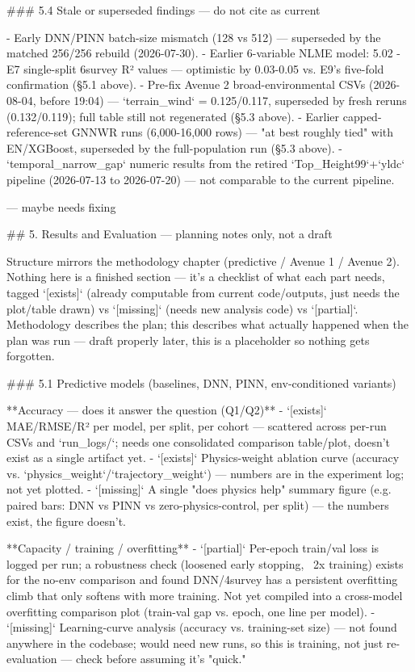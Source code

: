 ### 5.4 Stale or superseded findings — do not cite as current

- Early DNN/PINN batch-size mismatch (128 vs 512) — superseded by the matched 256/256 rebuild (2026-07-30).
- Earlier 6-variable NLME model: 5.02%
- E7 single-split 6survey R² values — optimistic by 0.03-0.05 vs. E9's five-fold confirmation (§5.1 above).
- Pre-fix Avenue 2 broad-environmental CSVs (2026-08-04, before 19:04) — `terrain_wind` = 0.125/0.117, superseded by fresh reruns (0.132/0.119); full table still not regenerated (§5.3 above).
- Earlier capped-reference-set GNNWR runs (6,000-16,000 rows) — "at best roughly tied" with EN/XGBoost, superseded by the full-population run (§5.3 above).
- `temporal_narrow_gap` numeric results from the retired `Top_Height99`+`yldc` pipeline (2026-07-13 to 2026-07-20) — not comparable to the current pipeline.


--- maybe needs fixing 

## 5. Results and Evaluation — planning notes only, not a draft

Structure mirrors the methodology chapter (predictive / Avenue 1 / Avenue 2). Nothing here is a finished
section — it's a checklist of what each part needs, tagged `[exists]` (already computable from current
code/outputs, just needs the plot/table drawn) vs `[missing]` (needs new analysis code) vs `[partial]`.
Methodology describes the plan; this describes what actually happened when the plan was run — draft
properly later, this is a placeholder so nothing gets forgotten.

### 5.1 Predictive models (baselines, DNN, PINN, env-conditioned variants)

**Accuracy — does it answer the question (Q1/Q2)**
- `[exists]` MAE/RMSE/R² per model, per split, per cohort — scattered across per-run CSVs and `run_logs/`; needs one consolidated comparison table/plot, doesn't exist as a single artifact yet.
- `[exists]` Physics-weight ablation curve (accuracy vs. `physics_weight`/`trajectory_weight`) — numbers are in the experiment log; not yet plotted.
- `[missing]` A single "does physics help" summary figure (e.g. paired bars: DNN vs PINN vs zero-physics-control, per split) — the numbers exist, the figure doesn't.

**Capacity / training / overfitting**
- `[partial]` Per-epoch train/val loss is logged per run; a robustness check (loosened early stopping, ~2x training) exists for the no-env comparison and found DNN/4survey has a persistent overfitting climb that only softens with more training. Not yet compiled into a cross-model overfitting comparison plot (train-val gap vs. epoch, one line per model).
- `[missing]` Learning-curve analysis (accuracy vs. training-set size) — not found anywhere in the codebase; would need new runs, so this is training, not just re-evaluation — check before assuming it's "quick."

